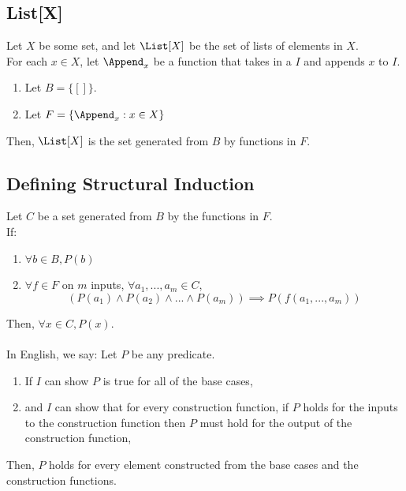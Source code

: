 \documentclass{article}
\begin{document}
\subsection{List[X]}
Let $X$ be some set, and let $\List[X]$ be the set of lists of elements in $X$.\\
For each $x \in X$, let $\Append_x$ be a function that takes in a $I$ and appends $x$ to $I$.
\begin{enumerate}
    \item Let $B = \{[]\}$.
    \item Let $F = \{\Append_x : x \in X\}$
\end{enumerate}
Then, $\List[X]$ is the set generated from $B$ by functions in $F$.

\subsection{Defining Structural Induction}
Let $C$ be a set generated from $B$ by the functions in $F$.\\
If:
\begin{enumerate}
    \item $\forall b \in B, P(b)$
    \item $\forall f \in F$ on $m$ inputs, $\forall a_1, ..., a_m \in C$,
    $$(P(a_1) \land P(a_2) \land ... \land P(a_m)) \implies P(f(a_1, ..., a_m))$$
\end{enumerate}

Then, $\forall x \in C, P(x)$.\\
\\
In English, we say:
Let $P$ be any predicate.
\begin{enumerate}
    \item If $I$ can show $P$ is true for all of the base cases,
    \item and $I$ can show that for every construction function, if $P$ holds for the inputs to the construction function then $P$ must hold for the output of the construction function,
\end{enumerate}
Then, $P$ holds for every element constructed from the base cases and the construction functions.
\end{document}
